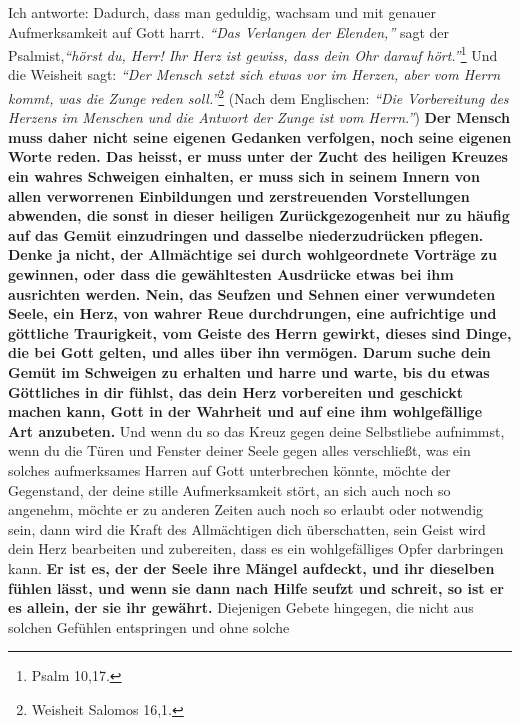  Ich antworte: Dadurch, dass man geduldig,
wachsam und mit genauer Aufmerksamkeit
auf Gott harrt. 
\textit{"`Das Verlangen der Elenden,"'} sagt der Psalmist,\textit{"`hörst du,
Herr! Ihr Herz ist gewiss, dass dein Ohr darauf hört."'}\footnote{Psalm 10,17.}
Und die Weisheit sagt:
\textit{"`Der Mensch setzt sich etwas vor im Herzen, aber vom
Herrn kommt, was die Zunge reden soll."'}\footnote{Weisheit Salomos 16,1.}
(Nach dem
Englischen:
\textit{"`Die Vorbereitung des Herzens im Menschen und die Antwort der Zunge
ist vom Herrn."'})
\label{ref:06_04_gebetshaltung} \textbf{Der Mensch muss
daher nicht seine eigenen Gedanken verfolgen,
noch seine eigenen Worte reden. Das heisst, er muss unter der Zucht des heiligen
Kreuzes ein wahres Schweigen einhalten, er muss sich in seinem Innern von allen
verworrenen Einbildungen und zerstreuenden Vorstellungen abwenden, die
sonst in dieser heiligen Zurückgezogenheit nur zu häufig auf das Gemüt
einzudringen und dasselbe niederzudrücken pflegen. Denke ja nicht, der
Allmächtige sei durch wohlgeordnete Vorträge zu gewinnen, oder dass die
gewähltesten Ausdrücke etwas bei ihm ausrichten werden. Nein, das Seufzen und
Sehnen einer verwundeten Seele, ein Herz, von wahrer Reue durchdrungen, eine
aufrichtige und göttliche Traurigkeit, vom Geiste des Herrn gewirkt, dieses sind
Dinge, die bei Gott gelten, und alles über ihn vermögen. Darum suche dein Gemüt
im Schweigen zu erhalten und harre und warte, bis du etwas Göttliches in dir
fühlst, das dein Herz vorbereiten und geschickt machen kann, Gott in der
Wahrheit und auf eine ihm wohlgefällige Art anzubeten.}
Und wenn du so das Kreuz
gegen deine Selbstliebe aufnimmst, wenn du die Türen und Fenster deiner Seele
gegen alles verschließt, was ein solches aufmerksames Harren auf Gott
unterbrechen könnte, möchte der Gegenstand, der deine stille Aufmerksamkeit
stört, an sich auch noch so angenehm, möchte er zu anderen Zeiten auch noch so
erlaubt oder notwendig sein, dann wird die Kraft des Allmächtigen dich
überschatten, sein Geist wird dein Herz bearbeiten und zubereiten, dass es ein
wohlgefälliges Opfer darbringen kann. \textbf{Er ist es, der der Seele ihre
Mängel
aufdeckt, und ihr dieselben fühlen lässt, und wenn sie dann nach Hilfe seufzt
und schreit, so ist er es allein, der sie ihr gewährt.}
Diejenigen Gebete
hingegen, die nicht aus solchen Gefühlen entspringen und ohne solche
